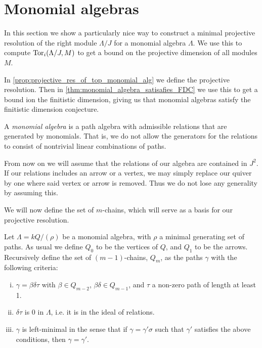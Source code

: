 \section{Monomial algebras}\label{sec:monomial_algebras}

In this section we show a particularly nice way to construct a minimal projective resolution of the right module $\Lambda / J$ for a monomial algebra $\Lambda$. We use this to compute $\operatorname{Tor}_i(\Lambda /J, M)$ to get a bound on the projective dimension of all modules $M$.

In \cref{prop:projective_res_of_top_monomial_alg} we define the projective resolution. Then in \cref{thm:monomial_algebra_satisafies_FDC} we use this to get a bound ion the finitistic dimension, giving us that monomial algebras satisfy the finitistic dimension conjecture.

\begin{defn}
	A \emph{monomial algebra} is a path algebra with admissible relations that are generated by monomials. That is, we do not allow the generators for the relations to consist of nontrivial linear combinations of paths.
\end{defn}

From now on we will assume that the relations of our algebra are contained in $J^2$. If our relations includes an arrow or a vertex, we may simply replace our quiver by one where said vertex or arrow is removed. Thus we do not lose any generality by assuming this.

We will now define the set of $m$-chains, which will serve as a basis for our projective resolution.

\begin{defn}[$m$-chains]\cite{GKK91}
	Let $\Lambda = kQ / (\rho)$ be a monomial algebra, with $\rho$ a minimal generating set of paths. As usual we define $Q_0$ to be the vertices of $Q$, and $Q_1$ to be the arrows. Recursively define the set of $(m-1)$-chains, $Q_m$, as the paths $\gamma$ with the following criteria:
	\begin{enumerate}[i)]
		\item $\gamma = \beta\delta\tau$ with $\beta \in Q_{m-2}$, $\beta\delta \in Q_{m-1}$, and $\tau$ a non-zero path of length at least 1.
		\item $\delta\tau$ is 0 in $\Lambda$, i.e. it is in the ideal of relations.
		\item $\gamma$ is left-minimal in the sense that if $\gamma = \gamma' \sigma$ such that $\gamma'$ satisfies the above conditions, then $\gamma = \gamma'$.
	\end{enumerate}
\end{defn}

